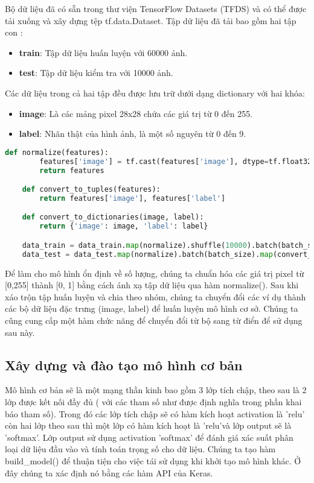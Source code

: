 Bộ dữ liệu đã có sẵn trong thư viện TensorFlow Datasets (TFDS) và có thể được tải xuống và xây dựng tệp tf.data.Dataset.
Tập dữ liệu đã tải bao gồm hai tập con :
\begin{itemize}
    \item \textbf{train}: Tập dữ liệu huấn luyện với 60000 ảnh.
    \item \textbf{test}: Tập dữ liệu kiểm tra với 10000 ảnh.
\end{itemize}

Các dữ liệu trong cả hai tập đều được lưu trữ dưới dạng dictionary với hai khóa:
\begin{itemize}
    \item \textbf{image}: Là các mảng pixel 28x28 chứa các giá trị từ 0 đến 255.
    \item \textbf{label}: Nhãn thật của hình ảnh, là một số nguyên từ 0 đến 9.
\end{itemize}

\begin{lstlisting}[language=Python]
    def normalize(features):
        features['image'] = tf.cast(features['image'], dtype=tf.float32) / 255.0
        return features

    def convert_to_tuples(features):
        return features['image'], features['label']

    def convert_to_dictionaries(image, label):
        return {'image': image, 'label': label}

    data_train = data_train.map(normalize).shuffle(10000).batch(batch_size).map(convert_to_tuples)
    data_test = data_test.map(normalize).batch(batch_size).map(convert_to_tuples)

\end{lstlisting}

Để làm cho mô hình ổn định về số lượng, chúng ta chuẩn hóa các giá trị pixel từ [0,255] thành [0, 1] bằng cách ánh xạ tập dữ liệu qua hàm normalize(). Sau khi xáo 
trộn tập huấn luyện và chia theo nhóm, chúng ta chuyển đổi các ví dụ thành các bộ dữ liệu đặc trưng (image, label) để huấn luyện mô hình cơ sở. Chúng ta 
cũng cung cấp một hàm chức năng để chuyển đổi từ bộ sang từ điển để sử dụng sau này.

\subsection{Xây dựng và đào tạo mô hình cơ bản}

Mô hình cơ bản sẽ là một mạng thần kinh bao gồm 3 lớp tích chập, theo sau là 2 lớp được kết nối đầy đủ ( với các tham số như được định nghĩa trong phần khai báo tham số). 
Trong đó các lớp tích chập sẽ có hàm kích hoạt activation là 'relu' còn hai lớp theo sau thì một lớp có hàm kích hoạt là 'relu'và lớp output sẽ là 'softmax'. Lớp output sử dụng 
activation 'softmax' để đánh giá xác suất phân loại dữ liệu đầu vào và tính toán trọng số cho dữ liệu.
Chúng ta tạo hàm build\_model() để thuận tiện cho việc tái sử dụng khi khởi tạo mô hình khác. 
Ở đây chúng ta xác định nó bằng các hàm API của Keras. 

